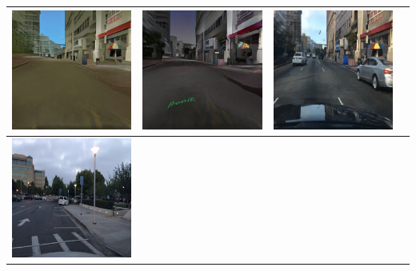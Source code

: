 \documentclass{VUMIFPSbakalaurinis}
\begin{document}
\begin{table}[H]
{\begin{tabular}{|c|c|c|c|}
            \includegraphics[scale=0.35]{img/pvz/6_cycle_v2} & \includegraphics[scale=0.35]{img/pvz/6_cut_v2} & \includegraphics[scale=0.35]{img/pvz/6_mspc_v2}
            \\
            \hline
            \includegraphics[scale=0.35]{img/pvz/7_real} & 

\end{tabular}}
\end{table}
\end{document}
